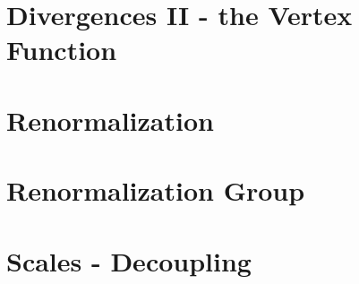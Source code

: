 \documentclass[11pt,twoside]{report}
\begin{document}
\chapter{Divergences II - the Vertex Function}
\label{cha:diverg-ii-vert}

\chapter{Renormalization}
\label{cha:renormalization}


\chapter{Renormalization Group}
\label{cha:renorm-group}

\chapter{Scales - Decoupling}
\label{cha:scales-decoupling}

\printindex
\end{document}
